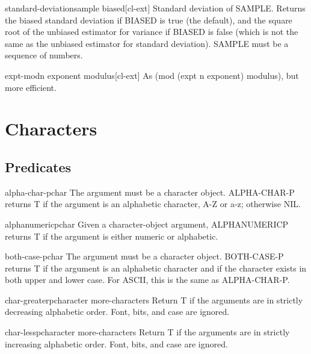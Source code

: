 \documentclass[10pt,english]{book}
\begin{document}
\begin{function}{standard-deviation}{sample \key biased}[cl-ext]
  Standard deviation of SAMPLE. Returns the biased standard deviation if
BIASED is true (the default), and the square root of the unbiased estimator
for variance if BIASED is false (which is not the same as the unbiased
estimator for standard deviation). SAMPLE must be a sequence of numbers.
\end{function}

\begin{function}{expt-mod}{n exponent modulus}[cl-ext]
  As (mod (expt n exponent) modulus), but more efficient.
\end{function}


\chapter{Characters}

\section{Predicates}
\label{sec:character-predicates}

\begin{function}{alpha-char-p}{char}
  The argument must be a character object. ALPHA-CHAR-P returns T if the
   argument is an alphabetic character, A-Z or a-z; otherwise NIL.
\end{function}

\begin{function}{alphanumericp}{char}
  Given a character-object argument, ALPHANUMERICP returns T if the
   argument is either numeric or alphabetic.
\end{function}

\begin{function}{both-case-p}{char}
  The argument must be a character object. BOTH-CASE-P returns T if the
  argument is an alphabetic character and if the character exists in
  both upper and lower case. For ASCII, this is the same as ALPHA-CHAR-P.
\end{function}

\begin{function}{char-greaterp}{character \rest more-characters}
  Return T if the arguments are in strictly decreasing alphabetic order.
   Font, bits, and case are ignored.
\end{function}

\begin{function}{char-lessp}{character \rest more-characters}
  Return T if the arguments are in strictly increasing alphabetic order.
   Font, bits, and case are ignored.
\end{function}
\end{document}
